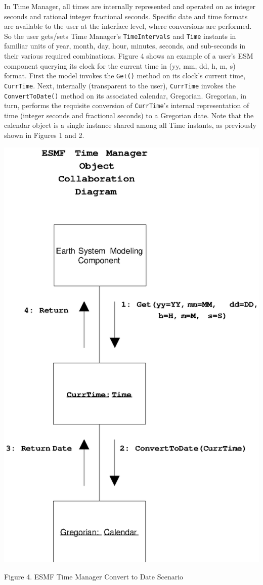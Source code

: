 

In Time Manager, all times are internally represented and operated on as
integer seconds and rational integer fractional seconds.  Specific date and
time formats are available to the user at the interface level, where
conversions are performed.  So the user gets/sets Time Manager's
{\tt TimeIntervals} and {\tt Time} instants in familiar units of year, month,
day, hour, minutes, seconds, and sub-seconds in their various required
combinations.  Figure 4 shows an example of a user's ESM component querying
its clock for the current time in (yy, mm, dd, h, m, s) format.  First the
model invokes the {\tt Get()} method on its clock's current time,
{\tt CurrTime}.  Next, internally (transparent to the user), {\tt CurrTime}
invokes the {\tt ConvertToDate()} method on its associated calendar, Gregorian.
Gregorian, in turn, performs the requisite conversion of {\tt CurrTime}'s
internal representation of time (integer seconds and fractional seconds)
to a Gregorian date.  Note that the calendar object is a single instance
shared among all Time instants, as previously shown in Figures 1 and 2.

\begin{center}
\includegraphics{TimeMgrOCD2.EPS}
   
Figure 4.  ESMF Time Manager Convert to Date Scenario
   
\end{center}
